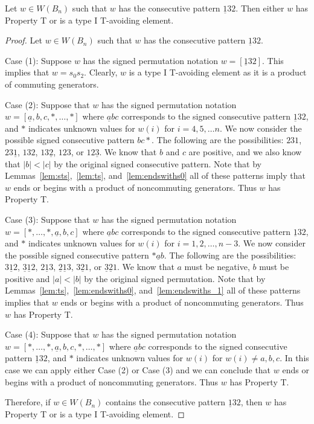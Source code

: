 \begin{lemma}\label{lem:132}
Let $w \in W(B_n)$ such that $w$ has the consecutive pattern $\underline{1}32$. Then either $w$ has Property T or is a type I T-avoiding element.
\begin{proof}
	Let $w \in W(B_n)$ such that $w$ has the consecutive pattern $\underline{1}32$.
	
	Case (1): Suppose $w$ has the signed permutation notation $w=[\underline{1}32]$. This implies that $w=s_0s_2$. Clearly, $w$ is a type I T-avoiding element as it is a product of commuting generators.
	
	Case (2): Suppose that $w$ has the signed permutation notation $w=[\underline{a},b,c, \ast, \ldots, \ast]$ where $\underline{a}bc$ corresponds to the signed consecutive pattern $\underline{1}32$, and $\ast$ indicates unknown values for $w(i)$ for $i=4,5, \ldots n$. We now consider the possible signed consecutive pattern $bc \ast$. The following are the possibilities: $231$, $23 \underline{1}$, $13 2$, $13 \underline{2}$, $123$, or $12\underline{3}$. We know that $b$ and $c$ are positive, and we also know that $|b|<|c|$ by the original signed consecutive pattern. Note that by Lemmas~\ref{lem:sts},~\ref{lem:ts}, and~\ref{lem:endswiths0} all of these patterns imply that $w$ ends or begins with a product of noncommuting generators. Thus $w$ has Property T.
	
	Case (3): Suppose that $w$ has the signed permutation notation $w=[\ast, \ldots, \ast, \underline{a},b,c]$ where $\underline{a}bc$ corresponds to the signed consecutive pattern $\underline{1}32$, and $\ast$ indicates unknown values for $w(i)$ for $i=1,2, \ldots ,n-3$. We now consider the possible signed consecutive pattern $\ast \underline{a} b$. The following are the possibilities: $3 \underline{1} 2$, $\underline{3} \underline{1} 2$, $2 \underline{1} 3$, $\underline{2} \underline{1} 3$, $3 \underline{2} 1$, or $\underline{3} \underline{2} 1$. We know that $a$ must be negative, $b$ must be positive and $|a|<|b|$ by the original signed permutation. Note that by Lemmas~\ref{lem:ts},~\ref{lem:endswiths0}, and~\ref{lem:endswiths_1} all of these patterns implies that $w$ ends or begins with a product of noncommuting generators. Thus $w$ has Property T. 
	
	Case (4): Suppose that $w$ has the signed permutation notation $w=[\ast, \ldots, \ast, \underline{a},b,c, \ast, \ldots, \ast]$ where $\underline{a}bc$ corresponds to the signed consecutive pattern $\underline{1}32$, and $\ast$ indicates unknown values for $w(i)$ for $w(i)\neq a,b,c$. In this case we can apply either Case (2) or Case (3) and we can conclude that $w$ ends or begins with a product of noncommuting generators. Thus $w$ has Property T.
	
	Therefore, if $w \in W(B_n)$ contains the consecutive pattern $\underline{1}32$, then $w$ has Property T or is a type I T-avoiding element.
\end{proof}	
\end{lemma}

